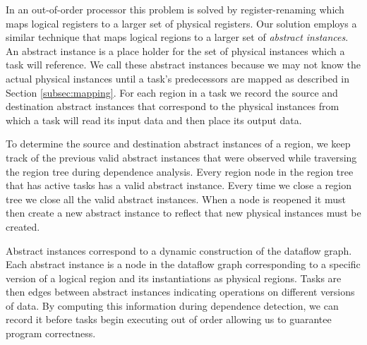 In an out-of-order processor this problem is solved by register-renaming which maps logical
registers to a larger set of physical registers.  Our solution employs a similar technique
that maps logical regions to a larger set of {\em abstract instances}.  An abstract instance
is a place holder for the set of physical instances which a task will reference.  We call these
abstract instances because we may not know the actual physical instances until a task's predecessors
are mapped as described in Section \ref{subsec:mapping}.  For each region in
a task we record the source and destination abstract instances that correspond to the physical
instances from which a task will read its input data and then place its output data.

To determine the source and destination abstract instances of a region, we keep track of 
the previous valid abstract instances that were observed while traversing the region tree
during dependence analysis.  Every region node in the region tree that has active tasks
has a valid abstract instance.  Every time we close a region tree we close all the valid
abstract instances.  When a node is reopened it must then create a new abstract instance
to reflect that new physical instances must be created.

Abstract instances correspond to a dynamic construction of the dataflow graph.  Each abstract
instance is a node in the dataflow graph corresponding to a specific version of a logical 
region and its instantiations as physical regions.  Tasks are then edges between abstract
instances indicating operations on different versions of data.  By computing this information
during dependence detection, we can record it before tasks begin executing out of order allowing
us to guarantee program correctness.  

